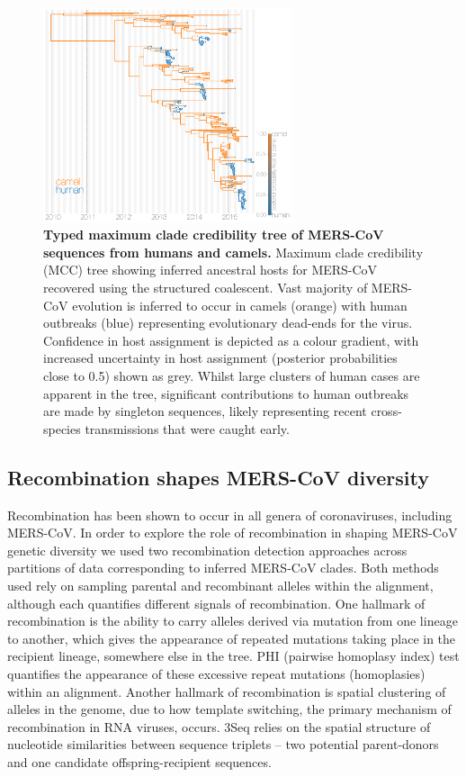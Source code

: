\documentclass[11pt,oneside,letterpaper]{article}
\begin{document}
\begin{figure}[h]
 \centering
	\includegraphics[width=0.65\textwidth]{figures/mers_mcc.png}
	\caption{\textbf{Typed maximum clade credibility tree of MERS-CoV sequences from humans and camels.}
	Maximum clade credibility (MCC) tree showing inferred ancestral hosts for MERS-CoV recovered using the structured coalescent.
	Vast majority of MERS-CoV evolution is inferred to occur in camels (orange) with human outbreaks (blue) representing evolutionary dead-ends for the virus.
  Confidence in host assignment is depicted as a colour gradient, with increased uncertainty in host assignment (posterior probabilities close to 0.5) shown as grey.
	Whilst large clusters of human cases are apparent in the tree, significant contributions to human outbreaks are made by singleton sequences, likely representing recent cross-species transmissions that were caught early.
	}
	\label{mcc}
\end{figure}



\subsection*{Recombination shapes MERS-CoV diversity}
Recombination has been shown to occur in all genera of coronaviruses, including MERS-CoV.
In order to explore the role of recombination in shaping MERS-CoV genetic diversity we used two recombination detection approaches across partitions of data corresponding to inferred MERS-CoV clades.
Both methods used rely on sampling parental and recombinant alleles within the alignment, although each quantifies different signals of recombination.
One hallmark of recombination is the ability to carry alleles derived via mutation from one lineage to another, which gives the appearance of repeated mutations taking place in the recipient lineage, somewhere else in the tree.
PHI (pairwise homoplasy index) test quantifies the appearance of these excessive repeat mutations (homoplasies) within an alignment.
Another hallmark of recombination is spatial clustering of alleles in the genome, due to how template switching, the primary mechanism of recombination in RNA viruses, occurs.
3Seq relies on the spatial structure of nucleotide similarities between sequence triplets -- two potential parent-donors and one candidate offspring-recipient sequences.
\end{document}
